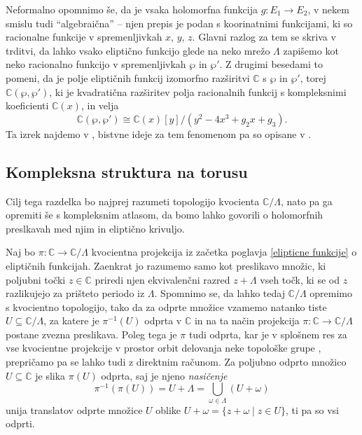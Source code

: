 \documentclass[mat1]{fmfdelo}
\numberwithin{equation}{section}
\newcommand{\C}{\mathbb C}
\newcommand{\om}{\omega}
\newcommand{\inv}{^{-1}}
\newcommand{\iso}{\cong}
\newcommand{\bigslant}[2]{{\raisebox{.2em}{$#1$}\left/\raisebox{-.2em}{$#2$}\right.}}
\theoremstyle{definition}
\begin{document}
Neformalno opomnimo še, da je vsaka holomorfna funkcija $g: E_1 \to E_2$, v nekem smislu tudi ``algebraična'' -- njen prepis je podan s koorinatnimi funkcijami, ki so racionalne funkcije v spremenljivkah $x$, $y$, $z$. Glavni razlog za tem se skriva v trditvi, da lahko vsako eliptično funkcijo glede na neko mrežo $\Lambda$ zapišemo kot neko racionalno funkcijo v spremenljivkah $\wp$ in $\wp'$. Z drugimi besedami to pomeni, da je polje eliptičnih funkcij izomorfno razširitvi $\C$ s $\wp$ in $\wp'$, torej $\C(\wp, \wp')$, ki je kvadratična razširitev polja racionalnih funkcij s kompleksnimi koeficienti $\C(x)$, in velja
\[
    \C(\wp, \wp') \iso 
    \C(x)[y]/(y^2 - 4x^3 + g_2x + g_3).
\]
Ta izrek najdemo v \cite[\textbf{1}, \S2, izrek 4]{LangEllfunc}, bistvne ideje za tem fenomenom pa so opisane v \cite[\S 2 in \S 3]{Stevenhagen}.




\subsection{Kompleksna struktura na torusu}
Cilj tega razdelka bo najprej razumeti topologijo kvocienta $\C/\Lambda$, nato pa ga opremiti še s kompleksnim atlasom, da bomo lahko govorili o holomorfnih preslkavah med njim in eliptično krivuljo. 

Naj bo $\pi: \C \to \C/\Lambda$ kvocientna projekcija iz začetka poglavja \ref{elipticne funkcije} o eliptičnih funkcijah. Zaenkrat jo razumemo samo kot preslikavo množic, ki poljubni točki $z \in \C$ priredi njen ekvivalenčni razred $z + \Lambda$ vseh točk, ki se od $z$ razlikujejo za prišteto periodo iz $\Lambda$. Spomnimo se, da lahko tedaj $\C/\Lambda$ opremimo s kvocientno topologijo, tako da za odprte množice vzamemo natanko tiste $U \subseteq \C/\Lambda$, za katere je $\pi\inv (U)$ odprta v $\C$ in na ta način projekcija $\pi:\C \to \C/\Lambda$ postane zvezna preslikava. Poleg tega je $\pi$ tudi odprta, kar je v splošnem res za vse kvocientne projekcije v prostor orbit delovanja neke topološke grupe \cite[trditev 3.42]{MrcunTop}, prepričamo pa se lahko tudi z direktnim računom. Za poljubno odprto množico $U \subseteq \C$ je slika $\pi(U)$ odprta, saj je njeno \emph{nasičenje}
\[
    \pi\inv(\pi(U)) = U + \Lambda = \bigcup_{\om \in \Lambda} (U + \om)
\]
unija translatov odprte množice $U$ oblike $U + \om = \{z + \om \mid z \in U \}$, ti pa so vsi odprti. 
\end{document}
